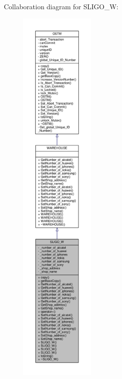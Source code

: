 Collaboration diagram for S\+L\+I\+G\+O\+\_\+W\+:\nopagebreak
\begin{figure}[H]
\begin{center}
\leavevmode
\includegraphics[height=550pt]{class_s_l_i_g_o___w__coll__graph}
\end{center}
\end{figure}
